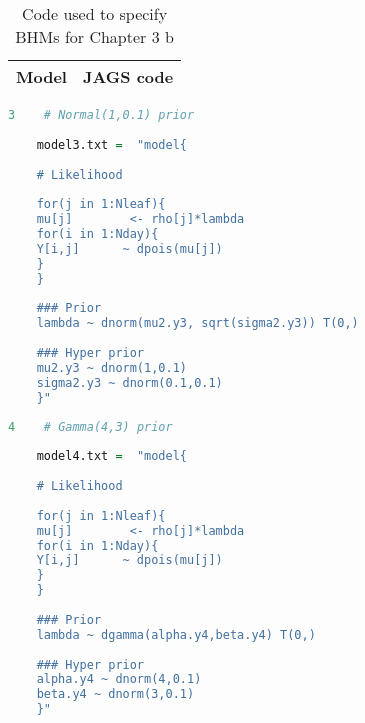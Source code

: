 \begin{table}[!htb]
	\caption{Code used to specify BHMs for Chapter 3 b}
	
	\begin{tabularx}{\textwidth}{rX}
		\toprule
		Model & JAGS code\\
		\bottomrule
	\end{tabularx}
	
	\begin{lstlisting}[language=R, showstringspaces=false]
	3    # Normal(1,0.1) prior
	
	model3.txt =  "model{
	
	# Likelihood
	
	for(j in 1:Nleaf){
	mu[j]        <- rho[j]*lambda
	for(i in 1:Nday){
	Y[i,j]      ~ dpois(mu[j])
	}
	}
	
	### Prior
	lambda ~ dnorm(mu2.y3, sqrt(sigma2.y3)) T(0,) 
	
	### Hyper prior
	mu2.y3 ~ dnorm(1,0.1)   
	sigma2.y3 ~ dnorm(0.1,0.1)
	}"
	\end{lstlisting}
	\intexthline
	\begin{lstlisting}[language=R, showstringspaces=false]
	4    # Gamma(4,3) prior
	
	model4.txt =  "model{
	
	# Likelihood
	
	for(j in 1:Nleaf){
	mu[j]        <- rho[j]*lambda
	for(i in 1:Nday){
	Y[i,j]      ~ dpois(mu[j])
	}
	}
	
	### Prior
	lambda ~ dgamma(alpha.y4,beta.y4) T(0,) 
	
	### Hyper prior
	alpha.y4 ~ dnorm(4,0.1)  
	beta.y4 ~ dnorm(3,0.1)
	}"
	\end{lstlisting}
\end{table}

